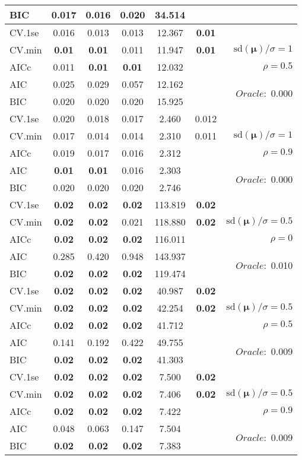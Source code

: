 \begin{table}
\begin{center}
\begin{tabular}{l*{5}{c}|r}
BIC & 0.017 & 0.016 & 0.020 & 34.514 & &  \\
 \hline 
CV.1se & 0.016 & 0.013 & 0.013 & 12.367 & {\bf 0.01} & \\
CV.min & {\bf 0.01} & {\bf 0.01} & 0.011 & 11.947 & {\bf 0.01} &  $\mathrm{sd}(\mathbf{\mu})/\sigma=1$ \\
AICc & 0.011 & {\bf 0.01} & {\bf 0.01} & 12.032 & & $\rho=0.5$ \\
AIC & 0.025 & 0.029 & 0.057 & 12.162 & &  \multirow{2}{*}{$Oracle: $ 0.000} \\
BIC & 0.020 & 0.020 & 0.020 & 15.925 & &  \\
 \hline 
CV.1se & 0.020 & 0.018 & 0.017 & 2.460 & 0.012 & \\
CV.min & 0.017 & 0.014 & 0.014 & 2.310 & 0.011 &  $\mathrm{sd}(\mathbf{\mu})/\sigma=1$ \\
AICc & 0.019 & 0.017 & 0.016 & 2.312 & & $\rho=0.9$ \\
AIC & {\bf 0.01} & {\bf 0.01} & 0.016 & 2.303 & &  \multirow{2}{*}{$Oracle: $ 0.000} \\
BIC & 0.020 & 0.020 & 0.020 & 2.746 & &  \\
 \hline 
CV.1se & {\bf 0.02} & {\bf 0.02} & {\bf 0.02} & 113.819 & {\bf 0.02} & \\
CV.min & {\bf 0.02} & {\bf 0.02} & 0.021 & 118.880 & {\bf 0.02} &  $\mathrm{sd}(\mathbf{\mu})/\sigma=0.5$ \\
AICc & {\bf 0.02} & {\bf 0.02} & {\bf 0.02} & 116.011 & & $\rho=0$ \\
AIC & 0.285 & 0.420 & 0.948 & 143.937 & &  \multirow{2}{*}{$Oracle: $ 0.010} \\
BIC & {\bf 0.02} & {\bf 0.02} & {\bf 0.02} & 119.474 & &  \\
 \hline 
CV.1se & {\bf 0.02} & {\bf 0.02} & {\bf 0.02} & 40.987 & {\bf 0.02} & \\
CV.min & {\bf 0.02} & {\bf 0.02} & {\bf 0.02} & 42.254 & {\bf 0.02} &  $\mathrm{sd}(\mathbf{\mu})/\sigma=0.5$ \\
AICc & {\bf 0.02} & {\bf 0.02} & {\bf 0.02} & 41.712 & & $\rho=0.5$ \\
AIC & 0.141 & 0.192 & 0.422 & 49.755 & &  \multirow{2}{*}{$Oracle: $ 0.009} \\
BIC & {\bf 0.02} & {\bf 0.02} & {\bf 0.02} & 41.303 & &  \\
 \hline 
CV.1se & {\bf 0.02} & {\bf 0.02} & {\bf 0.02} & 7.500 & {\bf 0.02} & \\
CV.min & {\bf 0.02} & {\bf 0.02} & {\bf 0.02} & 7.406 & {\bf 0.02} &  $\mathrm{sd}(\mathbf{\mu})/\sigma=0.5$ \\
AICc & {\bf 0.02} & {\bf 0.02} & {\bf 0.02} & 7.422 & & $\rho=0.9$ \\
AIC & 0.048 & 0.063 & 0.147 & 7.504 & &  \multirow{2}{*}{$Oracle: $ 0.009} \\
BIC & {\bf 0.02} & {\bf 0.02} & {\bf 0.02} & 7.383 & &  \\
 \hline 
\end{tabular}
\end{center}
\vspace{-1cm}
\end{table}




